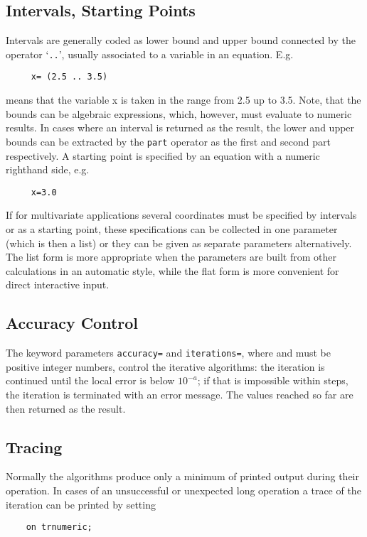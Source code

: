 \subsection{Intervals, Starting Points}

Intervals are generally coded as lower bound and
upper bound connected by the operator `\texttt{..}', usually
associated to a variable in an
equation. E.g.
\begin{verbatim}
     x= (2.5 .. 3.5)
\end{verbatim}
means that the variable x is taken in the range from 2.5 up to
3.5. Note, that the bounds can be algebraic
expressions, which, however, must evaluate to numeric results.
In cases where an interval is returned as the result, the lower
and upper bounds can be extracted by the \texttt{part} operator
as the first and second part respectively.
A starting point is specified by an equation with a numeric
righthand side, e.g.
\begin{verbatim}
     x=3.0
\end{verbatim}
If for multivariate applications several coordinates must be
specified by intervals or as a starting point, these
specifications can be collected in one parameter (which is then
a list) or they can be given as separate parameters
alternatively. The list form is more appropriate when the
parameters are built from other \REDUCE{} calculations in an
automatic style, while the flat form is more convenient
for direct interactive input.

\subsection{Accuracy Control}

The keyword parameters \texttt{accuracy=} and \texttt{iterations=}, where
 and  must be positive integer numbers, control the
iterative algorithms: the iteration is continued until
the local error is below $10^{-a}$; if that is impossible
within  steps, the iteration is terminated with an
error message. The values reached so far are then returned
as the result.

\subsection{Tracing}
Normally the algorithms produce only a minimum of printed
output during their operation. In cases of an unsuccessful
or unexpected long operation a trace of the iteration can be
printed by setting
\begin{verbatim}
    on trnumeric;
\end{verbatim}


